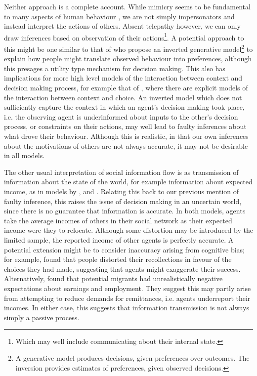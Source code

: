 \documentclass{article}
\begin{document}
Neither approach is a complete account. While mimicry seems to be fundamental to many aspects of human behaviour \citep{Chartrand1999}, we are not simply impersonators and instead interpret the actions of others. Absent telepathy however, we can only draw inferences based on observation of their actions\footnote{Which may well include communicating about their internal state.}. A potential approach to this might be one similar to that of \citet{Jern2011a} who propose an inverted generative model\footnote{A generative model produces decisions, given preferences over outcomes. The inversion provides estimates of preferences, given observed decisions.} to explain how people might translate observed behaviour into preferences, although this presages a utility type mechanism for decision making. This also has implications for more high level models of the interaction between context and decision making process, for example that of \citet{Ben-Akiva2012}, where there are explicit models of the interaction between context and choice. An inverted model which does not sufficiently capture the context in which an agent's decision making took place, i.e. the observing agent is underinformed about inputs to the other's decision process, or constraints on their actions, may well lead to faulty inferences about what drove their behaviour. Although this is realistic, in that our own inferences about the motivations of others are not always accurate, it may not be desirable in all models.

The other usual interpretation of social information flow is as transmission of information about the state of the world, for example information about expected income, as in models by \citet{Filho2011}, and \citet{Klabunde2014}.  Relating this back to our previous mention of faulty inference, this raises the issue of decision making in an uncertain world, since there is no guarantee that information is accurate. In both models, agents take the average incomes of others in their social network as their expected income were they to relocate. Although some distortion may be introduced by the limited sample, the reported income of other agents is perfectly accurate. 
A potential extension might be to consider inaccuracy arising from cognitive bias; for example, \citet{Mather2000} found that people distorted their recollections in favour of the choices they had made, suggesting that agents might exaggerate their success. Alternatively, \citet{McKenzie2013} found that potential migrants had unrealistically negative expectations about earnings and employment. They suggest this may partly arise from attempting to reduce demands for remittances, i.e. agents underreport their incomes. In either case, this suggests that information transmission is not always simply a passive process.
\end{document}
